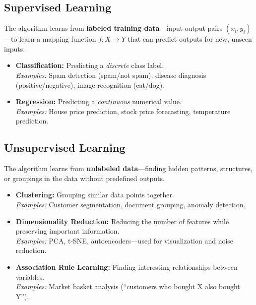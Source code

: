 \documentclass[11pt,a4paper]{article}
\begin{document}
\subsection{Supervised Learning}
\begin{definitionbox}
The algorithm learns from \textbf{labeled training data}---input-output pairs $(x_i, y_i)$---to learn a mapping function $f: X \rightarrow Y$ that can predict outputs for new, unseen inputs.
\end{definitionbox}

\begin{itemize}[leftmargin=*]
  \item \textbf{Classification:} Predicting a \emph{discrete} class label.\\
    \textit{Examples:} Spam detection (spam/not spam), disease diagnosis (positive/negative), image recognition (cat/dog).
  \item \textbf{Regression:} Predicting a \emph{continuous} numerical value.\\
    \textit{Examples:} House price prediction, stock price forecasting, temperature prediction.
\end{itemize}

\subsection{Unsupervised Learning}
\begin{definitionbox}
The algorithm learns from \textbf{unlabeled data}---finding hidden patterns, structures, or groupings in the data without predefined outputs.
\end{definitionbox}

\begin{itemize}[leftmargin=*]
  \item \textbf{Clustering:} Grouping similar data points together.\\
    \textit{Examples:} Customer segmentation, document grouping, anomaly detection.
  \item \textbf{Dimensionality Reduction:} Reducing the number of features while preserving important information.\\
    \textit{Examples:} PCA, t-SNE, autoencoders---used for visualization and noise reduction.
  \item \textbf{Association Rule Learning:} Finding interesting relationships between variables.\\
    \textit{Examples:} Market basket analysis (``customers who bought X also bought Y'').
\end{itemize}
\end{document}
